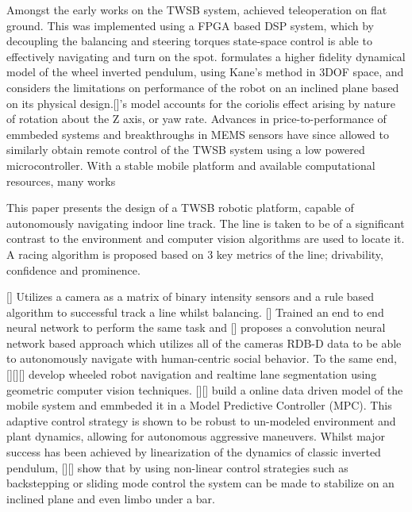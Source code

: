     Amongst the early works on the TWSB system,\cite{grasser2002joe} achieved teleoperation on flat ground. 
    This was implemented using a FPGA based DSP system, which by decoupling the balancing and steering torques 
    state-space control  is able to effectively navigating and turn on the spot. 
    \cite{kim2005dynamic} formulates a higher fidelity dynamical model of the wheel inverted pendulum, 
    using Kane's method in 3DOF space, and considers the limitations on performance of the robot on an 
    inclined plane based on its physical design.[]'s model accounts for the coriolis effect arising by nature of rotation about the Z axis, or yaw rate. 
    Advances in price-to-performance of emmbeded systems and breakthroughs in MEMS sensors \cite{MEMS} have since allowed 
    \cite{diaz2023ros} \cite{juang2013design} \cite{} to similarly obtain remote control of the TWSB system using a low powered microcontroller.
    With a stable mobile platform and available computational resources, many works
    
    This paper presents the design of a TWSB robotic platform, capable of autonomously navigating indoor line track. 
    The line is taken to be of a significant contrast to the environment and computer vision algorithms are used to 
    locate it. A racing algorithm is proposed based on 3 key metrics of the line; drivability, confidence and prominence.

    [] Utilizes a camera as a matrix of binary intensity sensors and a rule based algorithm to successful track 
    a line whilst balancing. [] Trained an end to end neural network to perform the same task and [] proposes 
    a convolution neural network based approach which utilizes all of the cameras RDB-D data to be able to 
    autonomously navigate with human-centric social behavior. 
    To the same end, [][][] develop wheeled robot navigation and realtime lane segmentation using 
    geometric computer vision techniques. 
    [][] build a online data driven model of the mobile system and emmbeded it in a Model Predictive Controller (MPC). 
    This adaptive control strategy is shown to be robust to un-modeled environment and plant dynamics, 
    allowing for autonomous aggressive maneuvers. 
    Whilst major success has been achieved by linearization of the dynamics of classic inverted pendulum, 
    [][] show that by using non-linear control strategies such as backstepping or sliding mode control
    the system can be made to stabilize on an inclined plane and even limbo under a bar.


